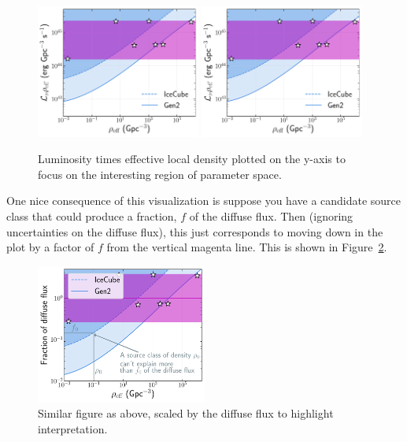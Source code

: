 \begin{figure}
    \centering
    \includegraphics[width=0.48\textwidth]{images/lumi_density_product.pdf}
    \includegraphics[width=0.48\textwidth]{images/lumi_density_product_hatch.pdf}
    \caption{Luminosity times effective local density plotted on the y-axis to focus on the interesting region of parameter space.}
    \label{fig:scaled_lumi_density}
\end{figure}

One nice consequence of this visualization is suppose you have a candidate source class that could produce a fraction, $f$ of the diffuse flux. Then (ignoring uncertainties on the diffuse flux), this just corresponds to moving down in the plot by a factor of $f$ from the vertical magenta line. This is shown in Figure~\ref{fig:diffuse_fraction_lumi}. 

\begin{figure}[h!]
    \centering
    \includegraphics[width=0.5\textwidth]{images/lumi_density_fraction.pdf}
    \caption{Similar figure as above, scaled by the diffuse flux to highlight interpretation.}
    \label{fig:diffuse_fraction_lumi}
\end{figure} 